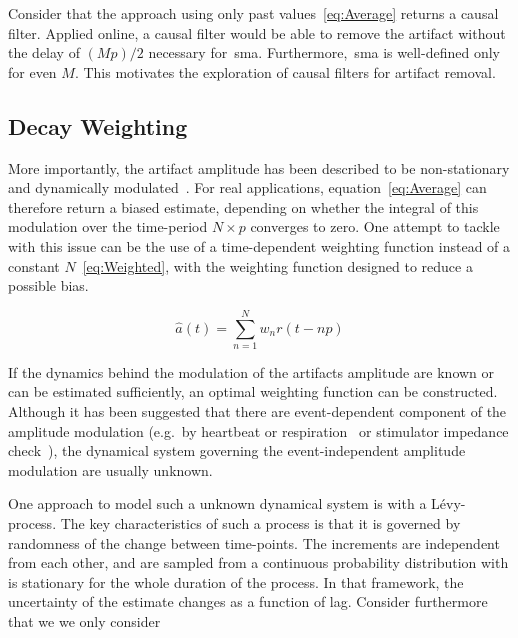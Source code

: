 \documentclass[a4paper]{article}
\begin{document}
Consider that the approach using only past values~\eqref{eq:Average} returns a causal filter. Applied online, a causal filter would be able to remove the artifact without the delay of $(Mp)/2$ necessary for~\gls{sma}. Furthermore,~\gls{sma} is well-defined only for even $M$. This motivates the exploration of causal filters for artifact removal.

\subsection{Decay Weighting}

More importantly, the artifact amplitude has been described to be non-stationary  and dynamically modulated~\citep{Noury_2016,Neuling_2017}.
For real applications, equation~\eqref{eq:Average} can therefore return a biased estimate, depending on whether the integral of this modulation over the time-period $N\times p$ converges to zero.
One attempt to tackle with this issue can be the use of a time-dependent weighting function instead of a constant $N$~\eqref{eq:Weighted}, with the weighting function designed to reduce a possible bias.

\begin{equation}
    \hat{a}(t) = \sum_{n=1}^{N} w_n r(t - np)\label{eq:Weighted}
\end{equation}

If the dynamics behind the modulation of the artifacts amplitude are known or can be estimated sufficiently, an optimal weighting function can be constructed. Although it has been suggested that there are event-dependent component of the amplitude modulation (e.g.\ by heartbeat or respiration~\cite{Noury_2016} or stimulator impedance check~\cite{Neuling_2017}), the dynamical system governing the event-independent amplitude modulation are usually unknown.

One approach to model such a unknown dynamical system is with a Lévy-process. The key characteristics of such a process is that it is governed by randomness of the change between time-points. The increments are independent from each other, and are sampled from a continuous probability distribution with is stationary for the whole duration of the process. In that framework, the uncertainty of the estimate changes as a function of lag. Consider furthermore that we we only consider 
\end{document}
